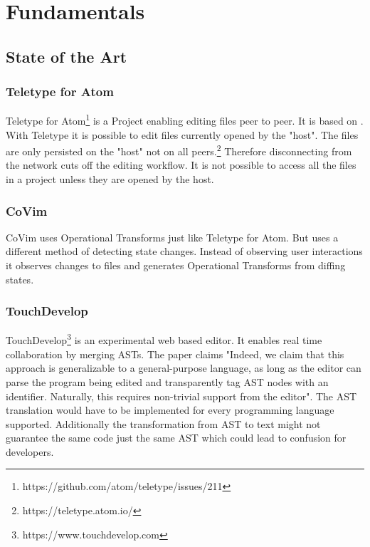 \chapter{Fundamentals}
\label{sec:fundamentals}

\section{State of the Art}


\subsection{Teletype for Atom}
Teletype for Atom\footnote{https://github.com/atom/teletype/issues/211} is a Project enabling editing files peer to peer. It is based on 	\cite{Oster:2006:DataconsistencyforP2Pcollaborativeediting} \cite{YuWeihai:2014} \cite{BriotUrsoShapiro:2016:HighResponsivenessGroupEditing}.
With Teletype it is possible to edit files currently opened by the "host". The files are only persisted on the "host" not on all peers.\footnote{https://teletype.atom.io/}
Therefore disconnecting from the network cuts off the editing workflow. It is not possible to access all the files in a project unless they are opened by the host. 
\subsection{CoVim}
CoVim\cite{ChoNgSun:2017:CoVim:Incorporatingreal-timecollaborationcapabilitiesintocomprehensivetexteditors} uses Operational Transforms just like Teletype for Atom. But uses a different method of detecting state changes. Instead of observing user interactions it observes changes to files and generates Operational Transforms from diffing states.
\subsection{TouchDevelop}
TouchDevelop\footnote{https://www.touchdevelop.com} is an experimental web based editor. It enables real time collaboration by merging ASTs. The paper claims "Indeed, we claim that this approach is generalizable to a
general-purpose language, as long as the editor can parse the
program being edited and transparently tag AST nodes with
an identifier. Naturally, this requires non-trivial support from
the editor".\cite{ProtzenkoBurckhardtMoskalMcClurg:2015:Implementingreal-timecollaborationinTouchDevelopusingASTmerges} The AST translation would have to be implemented for every programming language supported. Additionally the transformation from AST to text might not guarantee the same code just the same AST which could lead to confusion for developers.  
